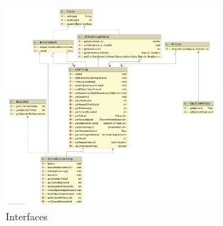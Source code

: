 

\begin{figure}[H]
    \centering
    \includegraphics[width=0.7\textwidth]{images/Interfaces.png}
    \caption{Interfaces}
    \label{fig:GPI}
\end{figure}